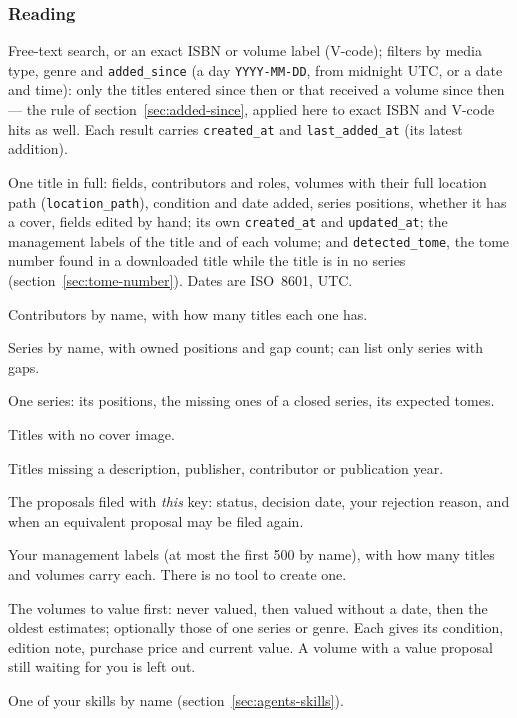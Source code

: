 \subsubsection*{Reading}

\begin{description}[style=nextline]
  \item[\texttt{search\_titles}] Free-text search, or an exact ISBN or
        volume label (V-code); filters by media type, genre and
        \texttt{added\_since} (a day \texttt{YYYY-MM-DD}, from midnight
        UTC, or a date and time): only the titles entered since then or
        that received a volume since then --- the rule of
        section~\ref{sec:added-since}, applied here to exact ISBN and
        V-code hits as well. Each result carries \texttt{created\_at}
        and \texttt{last\_added\_at} (its latest addition).
  \item[\texttt{get\_title}] One title in full: fields, contributors
        and roles, volumes with their full location path
        (\texttt{location\_path}), condition and date added, series
        positions, whether it has a cover, fields edited by hand; its
        own \texttt{created\_at} and \texttt{updated\_at}; the
        management labels of the title and of each volume; and
        \texttt{detected\_tome}, the tome number found in a downloaded
        title while the title is in no series
        (section~\ref{sec:tome-number}). Dates are ISO~8601, UTC.
  \item[\texttt{search\_contributors}] Contributors by name, with how
        many titles each one has.
  \item[\texttt{list\_series}] Series by name, with owned positions
        and gap count; can list only series with gaps.
  \item[\texttt{get\_series}] One series: its positions, the missing
        ones of a closed series, its expected tomes.
  \item[\texttt{list\_titles\_without\_cover}] Titles with no cover
        image.
  \item[\texttt{list\_titles\_with\_incomplete\_metadata}] Titles
        missing a description, publisher, contributor or publication
        year.
  \item[\texttt{list\_my\_proposals}] The proposals filed with
        \emph{this} key: status, decision date, your rejection reason,
        and when an equivalent proposal may be filed again.
  \item[\texttt{list\_labels}] Your management labels (at most the
        first 500 by name), with how many titles and volumes carry
        each. There is no tool to create one.
  \item[\texttt{list\_volumes\_to\_value}] The volumes to value
        first: never valued, then valued without a date, then the
        oldest estimates; optionally those of one series or genre. Each
        gives its condition, edition note, purchase price and current
        value. A volume with a value proposal still waiting for you is
        left out.
  \item[\texttt{get\_skill}] One of your skills by name
        (section~\ref{sec:agents-skills}).
\end{description}

